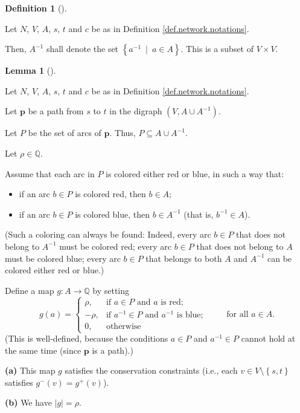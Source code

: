 \documentclass[numbers=enddot,12pt,final,onecolumn,notitlepage]{scrartcl}%
\theoremstyle{definition}
\newtheorem{lem}[theo]{Lemma}
\newenvironment{lemma}[1][]
{\begin{lem}[#1]\begin{leftbar}}
{\end{leftbar}\end{lem}}
\newtheorem{defi}[theo]{Definition}
\newenvironment{definition}[1][]
{\begin{defi}[#1]\begin{leftbar}}
{\end{leftbar}\end{defi}}
\begin{document}
\begin{definition}
\label{def.A-}Let $N$, $V$, $A$, $s$, $t$ and $c$ be as in Definition
\ref{def.network.notations}.

Then, $A^{-1}$ shall denote the set $\left\{  a^{-1}\ \mid\ a\in A\right\}  $.
This is a subset of $V\times V$.
\end{definition}

\begin{lemma}
\label{lem.6}Let $N$, $V$, $A$, $s$, $t$ and $c$ be as in Definition
\ref{def.network.notations}.

Let $\mathbf{p}$ be a path from $s$ to $t$ in the digraph $\left(  V,A\cup
A^{-1}\right)  $.

Let $P$ be the set of arcs of $\mathbf{p}$. Thus, $P\subseteq A\cup A^{-1}$.

Let $\rho\in\mathbb{Q}$.

Assume that each arc in $P$ is colored either red or blue, in such a way that:

\begin{itemize}
\item if an arc $b\in P$ is colored red, then $b\in A$;

\item if an arc $b\in P$ is colored blue, then $b\in A^{-1}$ (that is,
$b^{-1}\in A$).
\end{itemize}

(Such a coloring can always be found: Indeed, every arc $b\in P$ that does not
belong to $A^{-1}$ must be colored red; every arc $b\in P$ that does not
belong to $A$ must be colored blue; every arc $b\in P$ that belongs to both $A$
and $A^{-1}$ can be colored either red or blue.)

Define a map $g:A\rightarrow\mathbb{Q}$ by setting%
\[
g\left(  a\right)  =%
\begin{cases}
\rho, & \text{if }a\in P\text{ and }a\text{ is red};\\
-\rho, & \text{if }a^{-1}\in P\text{ and }a^{-1}\text{ is blue};\\
0, & \text{otherwise}%
\end{cases}
\ \ \ \ \ \ \ \ \ \ \text{for all }a\in A.
\]
(This is well-defined, because the conditions $a\in P$ and $a^{-1}\in P$
cannot hold at the same time (since $\mathbf{p}$ is a path).)

\textbf{(a)} This map $g$ satisfies the conservation constraints (i.e., each
$v\in V\setminus\left\{  s,t\right\}  $ satisfies $g^{-}\left(  v\right)
=g^{+}\left(  v\right)  $).

\textbf{(b)} We have $\left\vert g\right\vert =\rho$.
\end{lemma}
\end{document}
